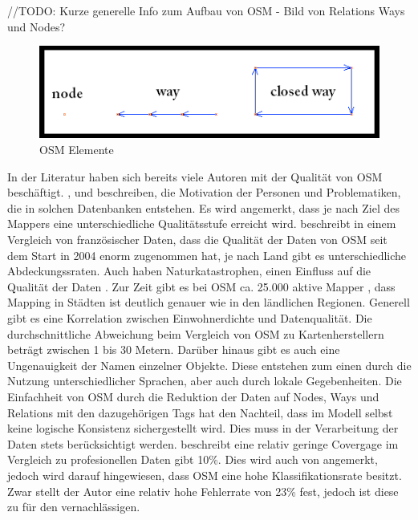 //TODO: Kurze generelle Info zum Aufbau von OSM - Bild  von Relations Ways und Nodes?

\begin{figure}[H]
\begin{center}
\includegraphics[width=120mm]{images/ch3_img03_OSM1.png}
\caption{OSM Elemente}
\label{img:ch03_img03_OSM1}
\end{center}
\end{figure}

In der Literatur haben sich bereits viele Autoren mit der Qualität von OSM beschäftigt.
\cite{Haklay.2010}, \cite{Flanagin.2008} und \cite{Goodchild.2007} beschreiben, die Motivation der Personen und Problematiken, die in solchen Datenbanken entstehen. Es wird angemerkt, dass je nach Ziel des Mappers eine unterschiedliche Qualitätsstufe erreicht wird.
\cite{Girres.2010} beschreibt in einem Vergleich von französischer Daten, dass die Qualität der Daten von OSM seit dem Start in 2004 enorm zugenommen hat, je nach Land gibt es unterschiedliche Abdeckungssraten. Auch haben Naturkatastrophen, einen Einfluss auf die Qualität der Daten \cite{Zook.2010}.
Zur Zeit gibt es bei OSM ca. 25.000 aktive Mapper \cite{OSM.2013}, dass Mapping in Städten ist deutlich genauer wie in den ländlichen Regionen. Generell gibt es eine Korrelation zwischen Einwohnerdichte und Datenqualität.
Die durchschnittliche Abweichung beim Vergleich von OSM zu Kartenherstellern beträgt zwischen 1 bis 30 Metern.
Darüber hinaus gibt es auch eine Ungenauigkeit der Namen einzelner Objekte. Diese entstehen zum einen durch die Nutzung unterschiedlicher Sprachen, aber auch durch lokale Gegebenheiten.
Die Einfachheit von OSM durch die Reduktion der Daten auf Nodes, Ways und Relations mit den dazugehörigen Tags hat den Nachteil, dass im Modell selbst keine logische Konsistenz sichergestellt wird. Dies muss in der Verarbeitung der Daten stets berücksichtigt werden.
\cite{Hecht.2013} beschreibt eine relativ geringe Covergage im Vergleich zu profesionellen Daten gibt 10\%. Dies wird auch von \cite{Pfoser.2013} angemerkt, jedoch wird darauf hingewiesen, dass OSM eine hohe Klassifikationsrate besitzt. Zwar stellt der Autor eine relativ hohe Fehlerrate von 23\% fest, jedoch ist diese zu für den vernachlässigen.

